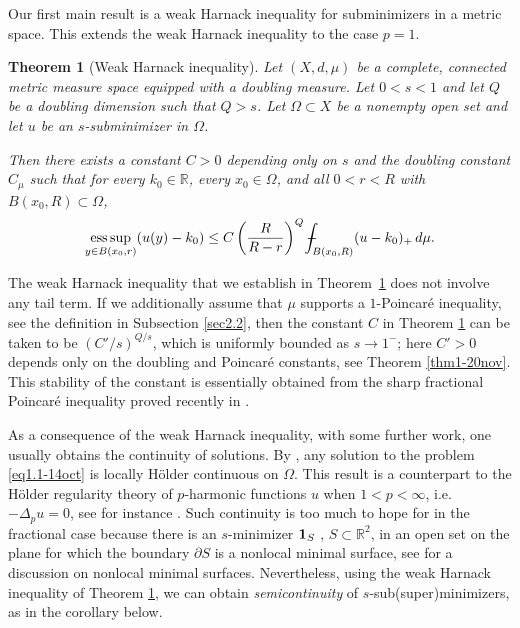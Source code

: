 \documentclass[11pt,leqno]{amsart}
\def\Xint#1{\mathchoice
	{\XXint\displaystyle\textstyle{#1}}
	{\XXint\textstyle\scriptstyle{#1}}
	{\XXint\scriptstyle\scriptscriptstyle{#1}}
	{\XXint\scriptscriptstyle\scriptscriptstyle{#1}}
	\!\int}
\def\XXint#1#2#3{{\setbox0=\hbox{$#1{#2#3}{\int}$ }
		\vcenter{\hbox{$#2#3$ }}\kern-.6\wd0}}
\def\dashint{\Xint-}
\newtheorem{theorem}{Theorem}[section]
\numberwithin{equation}{section}
\theoremstyle{definition}
\DeclareMathOperator*{\esssup}{ess\,sup}
\begin{document}
	
	
	Our first main result is a weak Harnack inequality for  subminimizers 
	{in a metric space.}
	This extends the weak Harnack inequality
	\cite[Theorem 1.1]{DKP16} to the case $p=1$.
	
	\begin{theorem}[Weak Harnack inequality]
		\label{thm1}
		Let $(X,d,\mu)$ be a complete, connected metric measure space equipped with a doubling measure.
		Let $0<s<1$ and let $Q$ be a doubling dimension such that $Q>s$.
		Let $\Omega\subset X$ be a nonempty open set and let $u$ be an $s$-subminimizer 
		in $\Omega$.
		
		Then there exists a constant $C>0$ depending only on $s$ and the doubling constant $C_\mu$ such that for every $k_0\in\mathbb R$,
		every $x_0\in\Omega$, and all $0<r<R$ with $B(x_0,R)\subset\Omega$,
		\[
		\esssup_{y\in B(x_0,r)}(u(y)-k_0)
		\le C\left(\frac{R}{R-r}\right)^Q
		\dashint_{B(x_0,R)}(u-k_0)_+\,d\mu.
		\]
		
	\end{theorem}
	
	The weak Harnack inequality that we establish in Theorem~\ref{thm1} does not involve
	any tail term. If we additionally assume that $\mu$ supports a $1$-Poincar\'e inequality, see the definition in Subsection \ref{sec2.2},
	then the constant $C$ in Theorem \ref{thm1} can be taken to be $(C'/s)^{Q/s}$, which is uniformly
		bounded as $s\to 1^-$;
	here $C'>0$ depends only on the doubling and Poincar\'e constants, see Theorem \ref{thm1-20nov}.
	This stability of the constant is essentially obtained
	from the sharp fractional Poincar\'e inequality proved recently in \cite{KLLZ25}.
	
	As a consequence of 
	the weak Harnack inequality, with some further work,
	one usually obtains the continuity of solutions. By  \cite[Theorem 1.2]{DKP16}, 
	any solution to the problem \eqref{eq1.1-14oct} is locally H\"older continuous on $\Omega$.  This result is a counterpart to the H\"older regularity theory of 
	$p$-harmonic functions $u$ when $1<p<\infty$, i.e. $-\Delta_pu=0$, see for instance \cite{BB11,HKM06}. Such continuity  is too much to hope for in the fractional case because 
	there is an $s$-minimizer ${\bf 1}_{S}$ , $S\subset \mathbb{R}^2$,
	in an open set
	on the plane for which
	the boundary
	$\partial S$ is a nonlocal minimal surface, see \cite{CRS10,Kl25} for a discussion
	on nonlocal minimal surfaces. 
	Nevertheless, using the weak Harnack inequality of Theorem \ref{thm1},
	we can obtain \emph{semicontinuity} of 
	{$s$-sub(super)minimizers,}
	as in the corollary below. 
	
\end{document}
